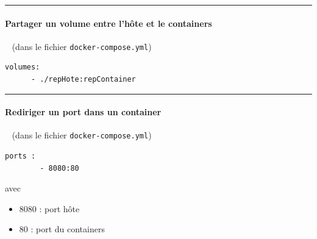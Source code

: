 \documentclass[french, 12pt]{article}%
\newcommand{\itemE}{\item[$\bullet$]}
\newcommand{\paraL}[1]{\tiny\noindent\rule{1.0\linewidth}{0.5pt}\paragraph*{#1}\  \normalsize}
\begin{document}
\paraL{Partager un volume entre l'hôte et le containers} (dans le fichier \verb?docker-compose.yml?)

\begin{lstlisting}[style=commande]
volumes:
      - ./repHote:repContainer
\end{lstlisting}




\paraL{Rediriger un port dans un container} (dans le fichier \verb?docker-compose.yml?)

\begin{lstlisting}[style=commande]
ports : 
        - 8080:80
\end{lstlisting}
avec 
\begin{itemize}
\itemE 8080 : port hôte
\itemE 80 : port du containers 
\end{itemize}
\end{document}
